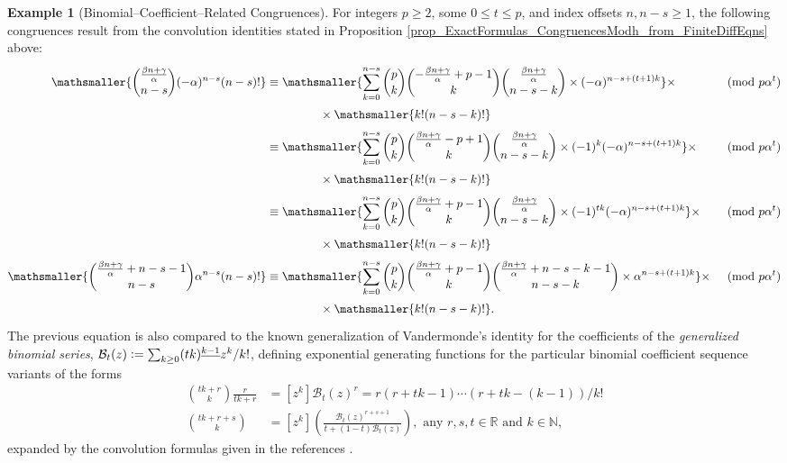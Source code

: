 \documentclass[12pt,reqno]{article}
\numberwithin{sfootnote}{section}
\numberwithin{equation}{section}
\theoremstyle{plain}
\theoremstyle{definition}
\newtheorem{example}[theorem]{Example}
\theoremstyle{remark}
\newcommand{\defequals}{\ensuremath{\vcentcolon=}}
\newcommand{\FFactII}[2]{\ensuremath{#1^{\underline{#2}}}}
\begin{document}
\begin{example}[Binomial--Coefficient--Related Congruences] 
For integers $p \geq 2$, 
some $0 \leq t \leq p$, and index offsets $n, n-s \geq 1$, the 
following congruences result from the convolution identities stated in 
Proposition \ref{prop_ExactFormulas_CongruencesModh_from_FiniteDiffEqns}
above: 
\begin{align*} 
\mathsmaller{ \binom{\frac{\beta n+\gamma}{\alpha}}{n-s} (-\alpha)^{n-s} (n-s)! } 
     & \equiv 
     \mathsmaller{ 
     \sum\limits_{k=0}^{n-s} 
     \binom{p}{k} 
     \binom{-\frac{\beta n+\gamma}{\alpha}+p-1}{k} 
     \binom{\frac{\beta n+\gamma}{\alpha}}{n-s-k} \times 
     (-\alpha)^{n-s+(t+1) k} 
     } \times && \pmod{p \alpha^{t}} \\ 
     & \phantom{\equiv \sum \qquad} \times 
     \mathsmaller{ 
     k! (n-s-k)! 
     } && \\ 
     & \equiv 
     \mathsmaller{ 
     \sum\limits_{k=0}^{n-s} 
     \binom{p}{k} 
     \binom{\frac{\beta n+\gamma}{\alpha}-p+1}{k} 
     \binom{\frac{\beta n+\gamma}{\alpha}}{n-s-k} \times 
     (-1)^{k} (-\alpha)^{n-s+(t+1) k} 
     } \times && \pmod{p \alpha^{t}} \\ 
     & \phantom{\equiv \sum \qquad} \times 
     \mathsmaller{ 
     k! (n-s-k)! 
     } && \\ 
     & \equiv 
     \mathsmaller{ 
     \sum\limits_{k=0}^{n-s} 
     \binom{p}{k} 
     \binom{\frac{\beta n+\gamma}{\alpha}+p-1}{k} 
     \binom{\frac{\beta n+\gamma}{\alpha}}{n-s-k} \times 
     (-1)^{tk} (-\alpha)^{n-s+(t+1) k} 
     } \times && \pmod{p \alpha^{t}} \\ 
     & \phantom{\equiv \sum \qquad} \times 
     \mathsmaller{ 
     k! (n-s-k)! 
     } && \\ 
\mathsmaller{ 
\binom{\frac{\beta n+\gamma}{\alpha}+n-s-1}{n-s} \alpha^{n-s} (n-s)! 
} 
     & \equiv 
     \mathsmaller{ 
     \sum\limits_{k=0}^{n-s} 
     \binom{p}{k} 
     \binom{\frac{\beta n+\gamma}{\alpha}+p-1}{k} 
     \binom{\frac{\beta n+\gamma}{\alpha}+n-s-k-1}{n-s-k} \times 
     \alpha^{n-s+(t+1) k} 
     } \times && \pmod{p \alpha^{t}} \\ 
     & \phantom{\equiv \sum \qquad} \times 
     \mathsmaller{ 
     k! (n-s-k)! 
     }. && 
\end{align*} 
The previous equation is also compared to the known generalization of 
Vandermonde's identity for the coefficients of the 
\emph{generalized binomial series}, 
$\mathcal{B}_t(z) \defequals \sum_{k \geq 0} \FFactII{(tk)}{k-1} z^k / k!$, 
defining exponential generating functions for the particular 
binomial coefficient sequence variants of the forms 
\begin{align*} 
     \binom{tk+r}{k} \frac{r}{tk+r} & = 
     [z^k] \mathcal{B}_t(z)^{r} = 
     r(r+tk-1) \cdots (r+tk-(k-1)) / k! \\ 
\binom{tk+r+s}{k} & = 
     [z^k] \left( 
     \frac{\mathcal{B}_t(z)^{r+s+1}}{t+(1-t) \mathcal{B}_t(z)} 
     \right), 
     \text{ any $r,s,t \in \mathbb{R}$ \ and \ $k \in \mathbb{N}$}, 
\end{align*} 
expanded by the convolution formulas given in the 
references \citep[\S 5.4; Table 169, Table 202]{GKP} \citep{CVLPOLYS}. 
\end{example} 
\end{document}
